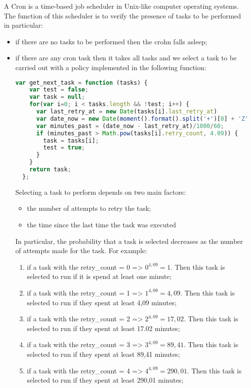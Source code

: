A Cron is a time-based job scheduler in Unix-like computer operating systems.
The function of this scheduler is to verify the presence of tasks to be performed in particular:
\begin{itemize}
\item if there are no tasks to be performed then the crohn falls asleep;
\item if there are any cron task then it takes all tasks and we select a task to be carried out with a policy implemented in the following function:
\begin{lstlisting}[language=javascript]
  var get_next_task = function (tasks) {
    var test = false;
    var task = null;
    for(var i=0; i < tasks.length && !test; i++) {
      var last_retry_at = new Date(tasks[i].last_retry_at)
      var date_now = new Date(moment().format().split('+')[0] + 'Z');
      var minutes_past = (date_now - last_retry_at)/1000/60;
      if (minutes_past > Math.pow(tasks[i].retry_count, 4.09)) {
        task = tasks[i];
        test = true;
      }
    }
    return task;
  };
\end{lstlisting}
Selecting a task to perform depends on two main factors:\begin{itemize}
\item the number of attempts to retry the task;
\item the time since the last time the task was executed
\end{itemize}
In particular, the probability that a task is selected decreases as the number of attempts made for the task.
For example:
\begin{enumerate}
\item if a task with the retry\_count = 0 => \(0^{4,09} = 1\). Then this task is selected to run if it is spend at least one minute;
\item if a task with the retry\_count = 1 => \(1^{4,09} = 4,09\). Then this task is selected to run if they spent at least 4,09 minutes;
\item if a task with the retry\_count = 2 => \(2^{4,09} = 17,02\). Then this task is selected to run if they spent at least 17.02 minutes;
\item if a task with the retry\_count = 3 => \(3^{4,09} = 89,41\). Then this task is selected to run if they spent at least 89,41 minutes;
\item if a task with the retry\_count = 4 => \(4^{4,09} = 290,01\). Then this task is selected to run if they spent at least 290,01 minutes;
\end{enumerate}

\end{itemize}

